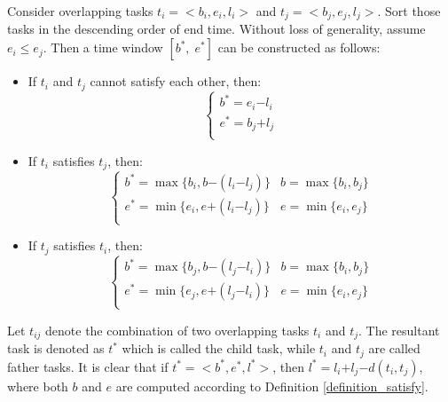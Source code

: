 \documentclass[prodmode,acmtosn]{acmsmall}
\begin{document}
\begin{definition}
Consider overlapping tasks $t_i\mathrm{=<}b_i,e_i,l_i\mathrm{>}$ and $t_j\mathrm{=<}b_j,e_j,l_j\mathrm{>}$. Sort those tasks in the descending order of end time. Without loss of generality, assume $e_i\mathrm{\le}e_j$. Then a time window $[b^\ast,\; e^\ast]$ can be constructed as follows:
\begin{itemize}
\item If $t_i$ and $t_j$ cannot satisfy each other, then:
\begin{equation}
\left\{ \begin{array}{ll}
b^\ast \mathrm{=} e_i\mathrm{-}l_i\\
e^\ast \mathrm{=} b_j\mathrm{+}l_j\\
\end{array} \right.
\end{equation}
\item If $t_i$ satisfies $t_j$, then:
\begin{equation}
\left\{ \begin{array}{ll}
b^\ast \mathrm{=} \max\{b_i, b\mathrm{-}(l_i\mathrm{-}l_j)\} &   b\mathrm{=}\max\{b_i,b_j\}\\
e^\ast \mathrm{=} \min\{e_i, e\mathrm{+}(l_i\mathrm{-}l_j)\}    &   e\mathrm{=}\min\{e_i,e_j\}\\
\end{array} \right.
\end{equation}
\item If $t_j$ satisfies $t_i$, then:
\begin{equation}
\left\{ \begin{array}{ll}
b^\ast \mathrm{=} \max\{b_j,b\mathrm{-}(l_j\mathrm{-}l_i)\} &   b\mathrm{=}\max\{b_i,b_j\}\\
e^\ast \mathrm{=} \min\{e_j,e\mathrm{+}(l_j\mathrm{-}l_i)\} &   e\mathrm{=}\min\{e_i,e_j\}\\
\end{array} \right.
\end{equation}
\end{itemize}
\label{definition_dominated_window}
\end{definition}


\begin{definition}[Combination]
Let $t_{ij}$ denote the combination of two overlapping tasks $t_i$ and $t_j$. The resultant task is denoted as $t^\ast$ which is called the child task, while $t_i$ and $t_j$ are called father tasks. It is clear that if $t^\ast\mathrm{=<}b^\ast,e^\ast,l^\ast\mathrm{>}$, then $l^\ast\mathrm{=}l_i\mathrm{+}l_j\mathrm{-}d(t_i,t_j)$, where both $b$ and $e$ are computed according to Definition  \ref{definition_satisfy}.
\end{definition}
\end{document}

